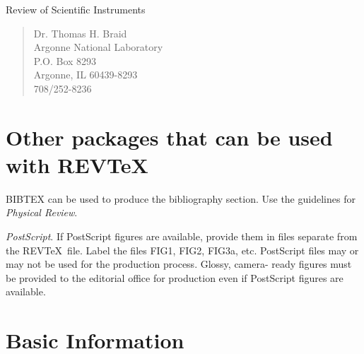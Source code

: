 \noindent      Review of Scientific Instruments

\begin{verse}
             Dr. Thomas H. Braid\\
             Argonne National Laboratory\\
             P.O. Box 8293\\
             Argonne, IL  60439-8293\\
             708/252-8236\\
\end{verse}


\section{Other packages that can be used with REV\TeX}

BIBTEX can be used to produce the bibliography section.  Use the guidelines
for {\em Physical Review}.

{\em PostScript}.  If PostScript figures are available, provide them in
files separate from the REV\TeX\ file. Label the files FIG1, FIG2, FIG3a,
etc.  PostScript files may or may not be used for the production process.
Glossy, camera- ready figures must be provided to the editorial office for
production even if PostScript figures are available.


\section{Basic Information}\label{basic}

